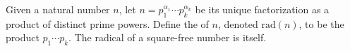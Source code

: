 \documentclass[12pt]{article}
\begin{document}
Given a natural number $n$, let $n = p_1^{{\alpha}_1} \cdots p_k^{{\alpha}_k}$ be its unique factorization as a product of distinct prime powers. Define the  of $n$, denoted $\mbox{rad}(n)$, to be the product $p_1 \cdots p_k$. The radical of a square-free number is itself.
\end{document}
